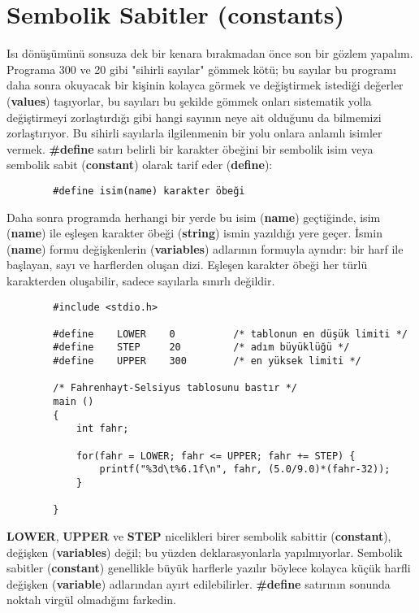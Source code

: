 \documentclass[a4paper,12pt,oneside]{book}
\begin{document}
\section{Sembolik Sabitler (constants)}

\par Isı dönüşümünü sonsuza dek bir kenara bırakmadan önce son bir gözlem yapalım. Programa 300 ve 20 gibi "sihirli sayılar" gömmek kötü; bu sayılar bu programı daha sonra okuyacak bir kişinin kolayca görmek ve değiştirmek istediği değerler (\textbf{values}) taşıyorlar, bu sayıları bu şekilde gömmek onları sistematik yolla değiştirmeyi zorlaştırdığı gibi hangi sayının neye ait olduğunu da bilmemizi zorlaştırıyor. Bu sihirli sayılarla ilgilenmenin bir yolu onlara anlamlı isimler vermek. \textbf{\#define} satırı belirli bir karakter öbeğini bir sembolik isim veya sembolik sabit (\textbf{constant}) olarak tarif eder (\textbf{define}):
\begin{lstlisting}
		#define isim(name) karakter öbeği
\end{lstlisting}
Daha sonra programda herhangi bir yerde bu isim (\textbf{name}) geçtiğinde, isim (\textbf{name}) ile eşleşen karakter öbeği (\textbf{string}) ismin yazıldığı yere geçer. İsmin (\textbf{name}) formu değişkenlerin (\textbf{variables}) adlarının formuyla aynıdır: bir harf ile başlayan, sayı ve harflerden oluşan dizi. Eşleşen karakter öbeği her türlü karakterden oluşabilir, sadece sayılarla sınırlı değildir.
\begin{lstlisting}
		#include <stdio.h>

		#define    LOWER    0          /* tablonun en düşük limiti */
		#define    STEP     20		   /* adım büyüklüğü */
		#define    UPPER    300        /* en yüksek limiti */

		/* Fahrenhayt-Selsiyus tablosunu bastır */
		main ()
		{
			int fahr;

			for(fahr = LOWER; fahr <= UPPER; fahr += STEP) {
				printf("%3d\t%6.1f\n", fahr, (5.0/9.0)*(fahr-32));
			}

		}
\end{lstlisting}

\textbf{LOWER}, \textbf{UPPER} ve \textbf{STEP} nicelikleri birer sembolik sabittir (\textbf{constant}), değişken (\textbf{variables}) değil; bu yüzden deklarasyonlarla yapılmıyorlar. Sembolik sabitler (\textbf{constant}) genellikle büyük harflerle yazılır böylece kolayca küçük harfli değişken (\textbf{variable}) adlarından ayırt edilebilirler. \textbf{\#define} satırının sonunda noktalı virgül olmadığını farkedin. \pagebreak
\end{document}
